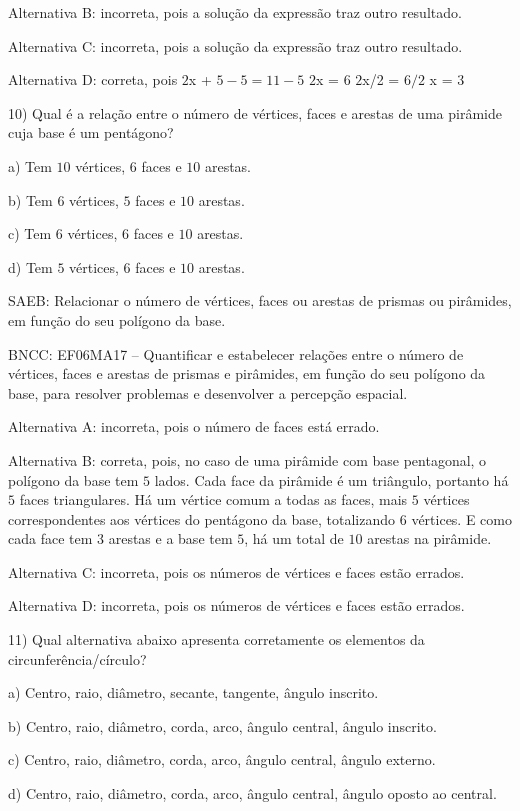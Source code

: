 Alternativa B: incorreta, pois a solução da expressão traz outro
resultado.

Alternativa C: incorreta, pois a solução da expressão traz outro
resultado.

Alternativa D: correta, pois $2$x + $5 - 5 = 11 - 5$ $2$x = $6$ $2$x/2 = $6/2$ x = $3$

10) Qual é a relação entre o número de vértices, faces e arestas de uma
pirâmide cuja base é um pentágono?

a) Tem $10$ vértices, $6$ faces e $10$ arestas.

b) Tem $6$ vértices, $5$ faces e $10$ arestas.

c) Tem $6$ vértices, $6$ faces e $10$ arestas.

d) Tem $5$ vértices, $6$ faces e $10$ arestas.

SAEB: Relacionar o número de vértices, faces ou arestas de prismas ou
pirâmides, em função do seu polígono da base.

BNCC: EF06MA17 -- Quantificar e estabelecer relações entre o número de
vértices, faces e arestas de prismas e pirâmides, em função do seu
polígono da base, para resolver problemas e desenvolver a percepção
espacial.

Alternativa A: incorreta, pois o número de faces está errado.

Alternativa B: correta, pois, no caso de uma pirâmide com base
pentagonal, o polígono da base tem $5$ lados. Cada face da pirâmide é um
triângulo, portanto há $5$ faces triangulares. Há um vértice comum a todas
as faces, mais $5$ vértices correspondentes aos vértices do pentágono da
base, totalizando $6$ vértices. E como cada face tem $3$ arestas e a base
tem $5$, há um total de $10$ arestas na pirâmide.

Alternativa C: incorreta, pois os números de vértices e faces estão
errados.

Alternativa D: incorreta, pois os números de vértices e faces estão
errados.

11) Qual alternativa abaixo apresenta corretamente os elementos da
circunferência/círculo?

a) Centro, raio, diâmetro, secante, tangente, ângulo inscrito.

b) Centro, raio, diâmetro, corda, arco, ângulo central, ângulo inscrito.

c) Centro, raio, diâmetro, corda, arco, ângulo central, ângulo externo.

d) Centro, raio, diâmetro, corda, arco, ângulo central, ângulo oposto ao
central.

